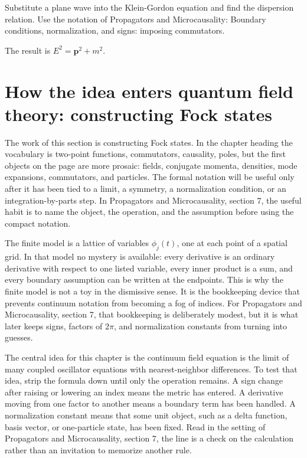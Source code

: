 \begin{exercise}
Substitute a plane wave into the Klein-Gordon equation and find the dispersion relation.  Use the notation of Propagators and Microcausality: Boundary conditions, normalization, and signs: imposing commutators.
\begin{answer}
The result is \(E^2=\bm p^2+m^2\).
\end{answer}
\end{exercise}



\section{How the idea enters quantum field theory: constructing Fock states}

The work of this section is constructing Fock states.  In the chapter heading the vocabulary is two-point functions, commutators, causality, poles, but the first objects on the page are more prosaic: fields, conjugate momenta, densities, mode expansions, commutators, and particles.  The formal notation will be useful only after it has been tied to a limit, a symmetry, a normalization condition, or an integration-by-parts step.  In Propagators and Microcausality, section 7, the useful habit is to name the object, the operation, and the assumption before using the compact notation.

The finite model is a lattice of variables \(\phi_j(t)\), one at each point of a spatial grid.  In that model no mystery is available: every derivative is an ordinary derivative with respect to one listed variable, every inner product is a sum, and every boundary assumption can be written at the endpoints.  This is why the finite model is not a toy in the dismissive sense.  It is the bookkeeping device that prevents continuum notation from becoming a fog of indices.  For Propagators and Microcausality, section 7, that bookkeeping is deliberately modest, but it is what later keeps signs, factors of \(2\pi\), and normalization constants from turning into guesses.

The central idea for this chapter is the continuum field equation is the limit of many coupled oscillator equations with nearest-neighbor differences.  To test that idea, strip the formula down until only the operation remains.  A sign change after raising or lowering an index means the metric has entered.  A derivative moving from one factor to another means a boundary term has been handled.  A normalization constant means that some unit object, such as a delta function, basis vector, or one-particle state, has been fixed.  Read in the setting of Propagators and Microcausality, section 7, the line is a check on the calculation rather than an invitation to memorize another rule.

